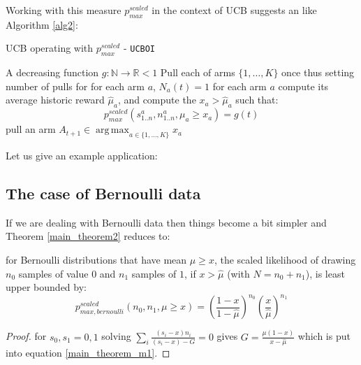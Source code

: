 \documentclass[12pt]{colt2020} %
\DeclareMathOperator*{\argmax}{arg\,max}
\begin{document}
Working with this measure $p_{max}^{scaled}$ in the context of UCB suggests an like Algorithm \ref{alg2}:

\begin{algorithm}
\caption{UCB operating with $p_{max}^{scaled}$ - \texttt{UCBOI}}
\label{alg2}
\begin{algorithmic}[1]
    \REQUIRE A decreasing function $g:\mathbb{N}\rightarrow\mathbb{R}<1$
	\STATE Pull each of arms $\{1,\dots,K\}$ once
	\STATE thus setting number of pulls for for each arm $a$, $N_a(t)=1$
		\STATE for each arm $a$ compute its average historic reward $\hat{\mu}_a$,
		\STATE and compute the $x_a>\hat{\mu}_a$ such that:
$$p_{max}^{scaled}(s_{1..n}^a,n_{1..n}^a,\mu_a\ge x_a) = g(t) $$\vspace{-4mm}%
		\STATE pull an arm $A_{t+1}\in\argmax_{a\in\{1,\dots,K\}}x_a$
	\ENDFOR
\end{algorithmic}
\end{algorithm}

Let us give an example application:

\subsection{The case of Bernoulli data}\label{sec:Bernoulli}

If we are dealing with Bernoulli data then things become a bit simpler and Theorem \ref{main_theorem2} reduces to:

\begin{theorem}\label{main_theorem2}
for Bernoulli distributions that have mean $\mu\ge x$, the scaled likelihood of drawing $n_0$ samples of value $0$ and $n_1$ samples of $1$, if $x>\hat{\mu}$ (with $N=n_0+n_1$), is least upper bounded by:\\
\begin{equation}\label{main_theorem2}p_{max,bernoulli}^{scaled}(n_0,n_1,\mu\ge x) = \left(\frac{1-x}{1-\hat{\mu}}\right)^{n_0}\left(\frac{x}{\hat{\mu}}\right)^{n_1}\end{equation}
\end{theorem}
\begin{proof}
for $s_0,s_1=0,1$ solving $\sum_i \frac{(s_i-x)n_i}{(s_i-x)-G} =0$ gives $G= \frac{\mu(1-x)}{x-\hat{\mu}}$ which is put into equation \ref{main_theorem_m1}. 
\end{proof}
\end{document}
